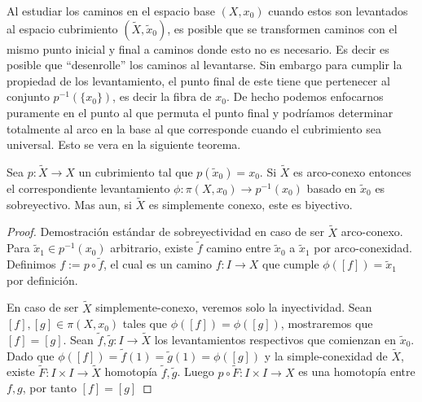Al estudiar los caminos en el espacio base \(\left(X, x_0 \right)\)
cuando estos son levantados al espacio cubrimiento \((\tilde X ,
\tilde x _0 )\), es posible que se transformen caminos con el mismo
punto inicial y final a caminos donde esto no es necesario. Es decir es
posible que ``desenrolle'' los caminos al levantarse. Sin embargo para
cumplir la propiedad de los levantamiento, el punto final de este tiene
que pertenecer al conjunto \(p^{-1} \left( \{x_0\} \right)\), es decir
la fibra de \(x_0\). De hecho podemos enfocarnos puramente en el punto
al que permuta el punto final y podríamos determinar totalmente al arco
en la base al que corresponde cuando el cubrimiento sea universal. Esto
se vera en la siguiente teorema.
\begin{teorema} \label{thm:phi-bijec}
  Sea \(p : \tilde X \to X\) un cubrimiento tal que \(p (\tilde x _0) =
  x_0\). Si \(\tilde X\) es arco-conexo entonces el correspondiente
  levantamiento \(\phi : \pi (X, x _0) \to p^{-1} (x_0)\) basado en
  \(\tilde x_0\) es sobreyectivo. Mas aun, si \(\tilde X\) es
  simplemente conexo, este es biyectivo.
\end{teorema}
\begin{proof}
  Demostración estándar de sobreyectividad en caso de ser \(\tilde X\)
  arco-conexo. Para \(\tilde x _1 \in p^{-1} (x_0)\) arbitrario, existe
  \(\tilde f\) camino entre \(\tilde x _0 \) a \(\tilde x _1\) por
  arco-conexidad. Definimos \(f := p \circ \tilde f\), el cual es un
  camino \(f : I \to X\) que cumple \(\phi ([f]) = \tilde x _1\) por
  definición.

  En caso de ser \(\tilde X\) simplemente-conexo, veremos solo la
  inyectividad. Sean \([f],[g] \in \pi (X, x_0)\) tales que \(\phi([f])
  = \phi([g])\), mostraremos que \([f] = [g]\). Sean \(\tilde f, \tilde
  g : I \to \tilde X\) los levantamientos respectivos que comienzan en
  \(\tilde x _0\). Dado que \(\phi([f]) = \tilde f (1) = \tilde g (1) =
  \phi([g])\) y la simple-conexidad de \(\tilde X\), existe \(\tilde F :
  I \times I \to \tilde X\) homotopía \(\tilde f, \tilde g\). Luego \(p
  \circ \tilde F : I \times I \to X \) es una homotopía entre \(f, g\),
  por tanto \([f] = [g]\)
\end{proof}
